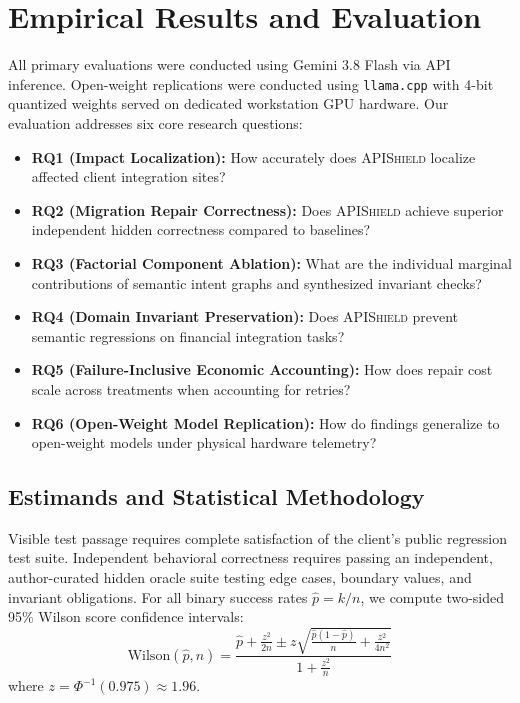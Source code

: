 \section{Empirical Results and Evaluation}
\label{sec:evaluation}

All primary evaluations were conducted using Gemini 3.8 Flash via API inference. Open-weight replications were conducted using \texttt{llama.cpp} with 4-bit quantized weights served on dedicated workstation GPU hardware. Our evaluation addresses six core research questions:
\begin{itemize}
    \item \textbf{RQ1 (Impact Localization):} How accurately does \textsc{APIShield} localize affected client integration sites?
    \item \textbf{RQ2 (Migration Repair Correctness):} Does \textsc{APIShield} achieve superior independent hidden correctness compared to baselines?
    \item \textbf{RQ3 (Factorial Component Ablation):} What are the individual marginal contributions of semantic intent graphs and synthesized invariant checks?
    \item \textbf{RQ4 (Domain Invariant Preservation):} Does \textsc{APIShield} prevent semantic regressions on financial integration tasks?
    \item \textbf{RQ5 (Failure-Inclusive Economic Accounting):} How does repair cost scale across treatments when accounting for retries?
    \item \textbf{RQ6 (Open-Weight Model Replication):} How do findings generalize to open-weight models under physical hardware telemetry?
\end{itemize}

\subsection{Estimands and Statistical Methodology}
Visible test passage requires complete satisfaction of the client's public regression test suite. Independent behavioral correctness requires passing an independent, author-curated hidden oracle suite testing edge cases, boundary values, and invariant obligations. For all binary success rates \(\hat{p} = k/n\), we compute two-sided 95\% Wilson score confidence intervals:
\[
\text{Wilson}(\hat{p}, n) = \frac{\hat{p} + \frac{z^2}{2n} \pm z \sqrt{\frac{\hat{p}(1-\hat{p})}{n} + \frac{z^2}{4n^2}}}{1 + \frac{z^2}{n}}
\]
where \(z = \Phi^{-1}(0.975) \approx 1.96\). 

